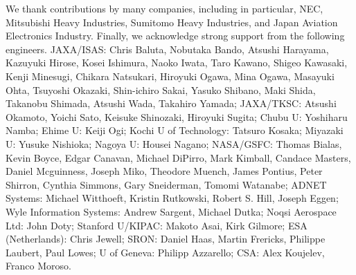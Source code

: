 We thank contributions by many companies, including in particular, NEC, Mitsubishi Heavy
Industries, Sumitomo Heavy Industries, and Japan Aviation Electronics Industry. Finally,
we acknowledge strong support from the following engineers.  JAXA/ISAS: Chris Baluta,
Nobutaka Bando, Atsushi Harayama, Kazuyuki Hirose, Kosei Ishimura, Naoko Iwata, Taro
Kawano, Shigeo Kawasaki, Kenji Minesugi, Chikara Natsukari, Hiroyuki Ogawa, Mina Ogawa,
Masayuki Ohta, Tsuyoshi Okazaki, Shin-ichiro Sakai, Yasuko Shibano, Maki Shida, Takanobu
Shimada, Atsushi Wada, Takahiro Yamada; JAXA/TKSC: Atsushi Okamoto, Yoichi Sato, Keisuke
Shinozaki, Hiroyuki Sugita; Chubu U: Yoshiharu Namba; Ehime U: Keiji Ogi; Kochi U of
Technology: Tatsuro Kosaka; Miyazaki U: Yusuke Nishioka; Nagoya U: Housei Nagano;
NASA/GSFC: Thomas Bialas, Kevin Boyce, Edgar Canavan, Michael DiPirro, Mark Kimball,
Candace Masters, Daniel Mcguinness, Joseph Miko, Theodore Muench, James Pontius, Peter
Shirron, Cynthia Simmons, Gary Sneiderman, Tomomi Watanabe; ADNET Systems: Michael
Witthoeft, Kristin Rutkowski, Robert S. Hill, Joseph Eggen; Wyle Information Systems:
Andrew Sargent, Michael Dutka; Noqsi Aerospace Ltd: John Doty; Stanford U/KIPAC: Makoto
Asai, Kirk Gilmore; ESA (Netherlands): Chris Jewell; SRON: Daniel Haas, Martin Frericks,
Philippe Laubert, Paul Lowes; U of Geneva: Philipp Azzarello; CSA: Alex Koujelev, Franco
Moroso.

